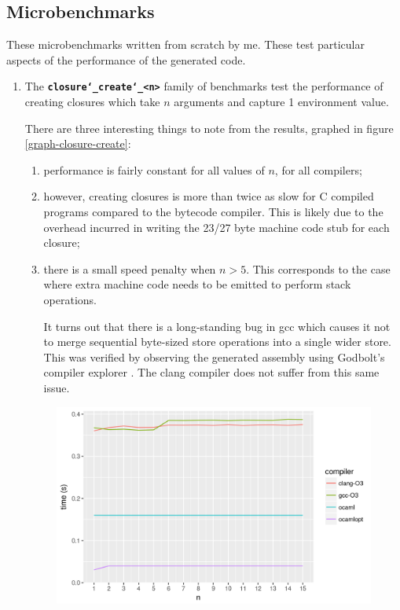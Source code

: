 \documentclass[12pt,a4paper,twoside,openright]{report}
\begin{document}
\subsection{Microbenchmarks}
These microbenchmarks written from scratch by me. These test particular aspects
of the performance of the generated code.

\begin{enumerate}
  \item
    The \textbf{\texttt{closure\char`_create\char`_<n>}} family of benchmarks test the performance of
    creating closures which take $n$ arguments and capture 1 environment value.

    There are three interesting things to note from the results, graphed in figure \ref{graph-closure-create}:
    \begin{enumerate}
      \item performance is fairly constant for all values of $n$, for all compilers;
      \item however, creating closures is more than twice as slow for C
        compiled programs compared to the bytecode compiler. This is likely
        due to the overhead incurred in writing the 23/27 byte machine code stub
        for each closure;

      \item there is a small speed penalty when $n>5$. This
        corresponds to the case where extra machine code needs to be emitted to
        perform stack operations.

        It turns out that there is a long-standing
        bug in gcc which causes it not to merge sequential byte-sized store
        operations into a single wider store. This was verified by observing
        the generated assembly using Godbolt's compiler explorer
        \cite{godbolt}. The clang compiler does not suffer from this same
        issue.
    \end{enumerate}

    \begin{figure}[h]
\centering
  \includegraphics[width=16cm]{resultclosure_create_summary_all-b477d4580}


\end{figure}
\end{enumerate}
\end{document}
